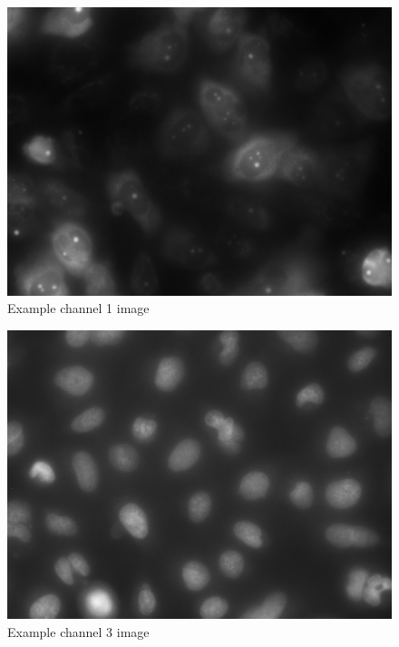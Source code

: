 \documentclass[a4paper, 12pt, twoside]{article}
\begin{document}
\begin{figure}[H]
\centering
\includegraphics[height=\linewidth, angle=90]{images/example_Kanal1}
Example channel 1 image
\end{figure}

\begin{figure}[H]
\centering
\includegraphics[height=\linewidth, angle=90]{images/example_Kanal3}
Example channel 3 image
\end{figure}
\end{document}
